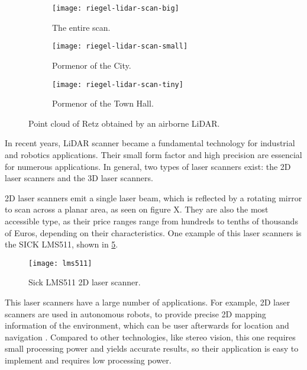 \begin{figure}[p]
    \centering
    \begin{subfigure}{\textwidth}
        \centering
        \texttt{[image: riegel-lidar-scan-big]}
        \caption{The entire scan.}
        \label{fig:riegl-lidar-scan-big}
    \end{subfigure}

    \centering
    \begin{subfigure}{\textwidth}
        \centering
        \texttt{[image: riegel-lidar-scan-small]}
        \caption{Pormenor of the City.}
        \label{fig:riegl-lidar-scan-small}
    \end{subfigure}

    \centering
    \begin{subfigure}{\textwidth}
        \centering
        \texttt{[image: riegel-lidar-scan-tiny]}
        \caption{Pormenor of the Town Hall.}
        \label{fig:riegl-lidar-scan-tiny}
    \end{subfigure}

    \caption{Point cloud of Retz obtained by an airborne LiDAR.}
    \label{fig:riegl-lidar-scan}
\end{figure}

In recent years, LiDAR scanner became a fundamental technology for industrial and robotics applications. Their small form factor and high precision are essencial for numerous applications. In general, two types of laser scanners exist: the 2D laser scanners and the 3D laser scanners. 

2D laser scanners emit a single laser beam, which is reflected by a rotating mirror to scan across a planar area, as seen on figure X. They are also the most accessible type, as their price ranges range from hundreds to tenths of thousands of Euros, depending on their characteristics. One example of this laser scanners is the SICK LMS511, shown in \cref{fig:sick-lms511}. 

\begin{figure}
    \centering
    \texttt{[image: lms511]}
    \caption{Sick LMS511 2D laser scanner.}
    \label{fig:sick-lms511}
\end{figure}

This laser scanners have a large number of applications. For example, 2D laser scanners are used in autonomous robots, to provide precise 2D mapping information of the environment, which can be user afterwards for location and navigation \cite{siritanawan17}. Compared to other technologies, like stereo vision, this one requires small processing power and yields accurate results, so their application is easy to implement and requires low processing power. 

